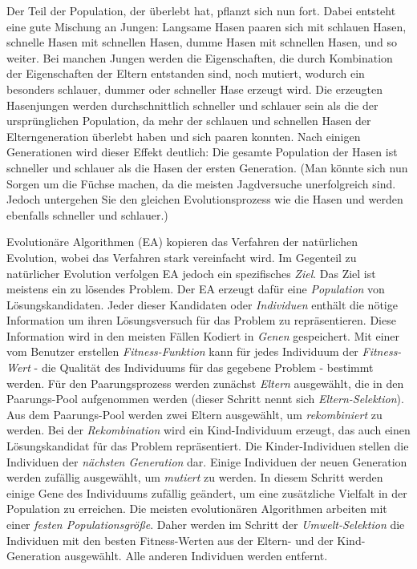 Der Teil der Population, der überlebt hat, pflanzt sich nun fort. Dabei entsteht eine gute Mischung an Jungen: Langsame Hasen paaren sich mit schlauen Hasen, schnelle Hasen mit schnellen Hasen, dumme Hasen mit schnellen Hasen, und so weiter. Bei manchen Jungen werden die Eigenschaften, die durch Kombination der Eigenschaften der Eltern entstanden sind, noch mutiert, wodurch ein besonders schlauer, dummer oder schneller Hase erzeugt wird. Die erzeugten Hasenjungen werden durchschnittlich schneller und schlauer sein als die der ursprünglichen Population, da mehr der schlauen und schnellen Hasen der Elterngeneration überlebt haben und sich paaren konnten. Nach einigen Generationen wird dieser Effekt deutlich: Die gesamte Population der Hasen ist schneller und schlauer als die Hasen der ersten Generation. (Man könnte sich nun Sorgen um die Füchse machen, da die meisten Jagdversuche unerfolgreich sind. Jedoch untergehen Sie den gleichen Evolutionsprozess wie die Hasen und werden ebenfalls schneller und schlauer.)

Evolutionäre Algorithmen (EA) kopieren das Verfahren der natürlichen Evolution, wobei das Verfahren stark vereinfacht wird. Im Gegenteil zu natürlicher Evolution verfolgen EA jedoch ein spezifisches \textit{Ziel}. Das Ziel ist meistens ein zu lösendes Problem. Der EA erzeugt dafür eine \textit{Population} von Lösungskandidaten. Jeder dieser Kandidaten oder \textit{Individuen} enthält die nötige Information um ihren Lösungsversuch für das Problem zu repräsentieren. Diese Information wird in den meisten Fällen Kodiert in \textit{Genen} gespeichert. Mit einer vom Benutzer erstellen \textit{Fitness-Funktion} kann für jedes Individuum der \textit{Fitness-Wert} - die Qualität des Individuums für das gegebene Problem - bestimmt werden. Für den Paarungsprozess werden zunächst \textit{Eltern} ausgewählt, die in den Paarungs-Pool aufgenommen werden (dieser Schritt nennt sich \textit{Eltern-Selektion}). Aus dem Paarungs-Pool werden zwei Eltern ausgewählt, um \textit{rekombiniert} zu werden. Bei der \textit{Rekombination} wird ein Kind-Individuum erzeugt, das auch einen Lösungskandidat für das Problem repräsentiert. Die Kinder-Individuen stellen die Individuen der \textit{nächsten Generation} dar. Einige Individuen der neuen Generation werden zufällig ausgewählt, um \textit{mutiert} zu werden. In diesem Schritt werden einige Gene des Individuums zufällig geändert, um eine zusätzliche Vielfalt in der Population zu erreichen. Die meisten evolutionären Algorithmen arbeiten mit einer \textit{festen Populationsgröße}. Daher werden im Schritt der \textit{Umwelt-Selektion} die Individuen mit den besten Fitness-Werten aus der Eltern- und der Kind-Generation ausgewählt. Alle anderen Individuen werden entfernt. 

